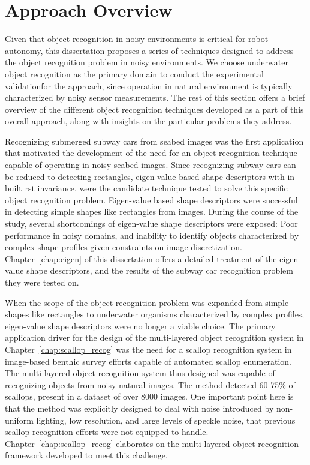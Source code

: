 \section{Approach Overview}

Given that object recognition in noisy environments is critical for robot autonomy, this dissertation proposes a series of techniques designed to address the object recognition problem in noisy environments.
We choose
underwater object recognition as the primary domain to conduct the experimental validationfor the approach, since operation in natural environment is typically characterized by noisy sensor measurements.
The rest of this section offers a brief overview of the different object recognition techniques developed as a part of this overall approach, along with insights on the particular problems they address.

Recognizing submerged subway cars from seabed images was the first application that motivated the development of the need for 
an object recognition technique capable of operating in noisy seabed images. Since recognizing subway cars can be reduced 
to detecting rectangles, eigen-value based shape descriptors with in-built \gls{rst} invariance, were the candidate technique tested
to solve this specific object recognition problem. Eigen-value based shape descriptors were successful in detecting 
simple shapes like rectangles from images.
During the course of the study, several shortcomings of eigen-value shape descriptors were exposed: Poor performance in noisy domains, and inability to identify objects characterized by complex shape profiles given constraints on image discretization. Chapter~\ref{chap:eigen} of this dissertation offers a detailed treatment of the eigen value shape descriptors, and the results of the subway car recognition problem they were tested on.

When the scope of the object recognition problem was expanded from simple shapes like rectangles to underwater organisms characterized by complex profiles,
eigen-value shape descriptors were no longer a viable choice. The primary application driver for the design of the multi-layered object recognition system in Chapter~\ref{chap:scallop_recog} was the need for a 
scallop recognition system in image-based benthic survey efforts capable of automated scallop enumeration. 
The multi-layered object recognition system thus designed was capable of recognizing objects from noisy natural images. The method detected 60-75\% of scallops, present in a dataset of over 8000 images. One important point here is that the method was explicitly designed to deal with noise introduced by non-uniform lighting, low resolution, and large levels of speckle noise, that previous scallop recognition efforts were not equipped to handle. Chapter~\ref{chap:scallop_recog} elaborates on the multi-layered object recognition framework developed to meet this challenge.

